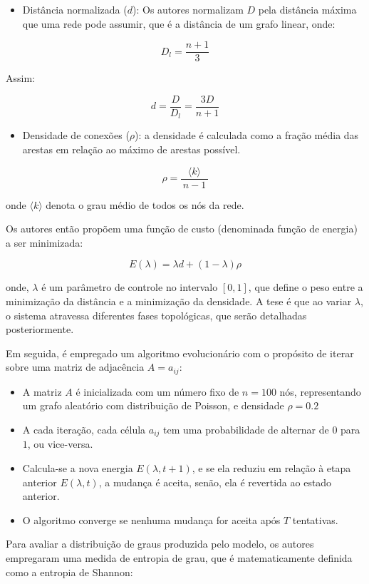 \documentclass[12pt,oneside,a4paper,brazil,sumario=tradicional]{abntex2}
\begin{document}
\begin{itemize}
  \item Distância normalizada ($d$): Os autores normalizam $D$ pela distância máxima que uma rede pode assumir, que é a distância de um grafo linear, onde:
\end{itemize}
\[D_{l} = \frac{n+1}{3}\]

Assim:

\[d = \frac{D}{D_{l}} = \frac{3D}{n+1}\]

\begin{itemize}
  \item Densidade de conexões ($\rho$): a densidade é calculada como a fração média das arestas em relação ao máximo de arestas possível.
\end{itemize}
\[\rho = \frac{\langle k \rangle}{\,n-1\,}\]

onde $\langle k \rangle$ denota o grau médio de todos os nós da rede.

Os autores então propõem uma função de custo (denominada função de energia) a ser minimizada:

\[E(\lambda) = \lambda d + (1-\lambda)\rho\]

onde, $\lambda$ é um parâmetro de controle no intervalo $[0,1]$, que define o peso entre a minimização da distância e a minimização da densidade. A tese é que ao variar $\lambda$, o sistema atravessa diferentes fases topológicas, que serão detalhadas posteriormente.

Em seguida, é empregado um algoritmo evolucionário com o propósito de iterar sobre uma matriz de adjacência $A = a_{ij}$:

\begin{itemize}
  \item A matriz $A$ é inicializada com um número fixo de $n = 100$ nós, representando um grafo aleatório com distribuição de Poisson, e densidade $\rho = 0.2$
  \item A cada iteração, cada célula $a_{ij}$ tem uma probabilidade de alternar de $0$ para $1$, ou vice-versa.
  \item Calcula-se a nova energia $E(\lambda, t+1)$, e se ela reduziu em relação à etapa anterior $E(\lambda, t)$, a mudança é aceita, senão, ela é revertida ao estado anterior.
  \item O algoritmo converge se nenhuma mudança for aceita após $T$ tentativas.
\end{itemize}
Para avaliar a distribuição de graus produzida pelo modelo, os autores empregaram uma medida de entropia de grau, que é matematicamente definida como a entropia de Shannon:
\end{document}
